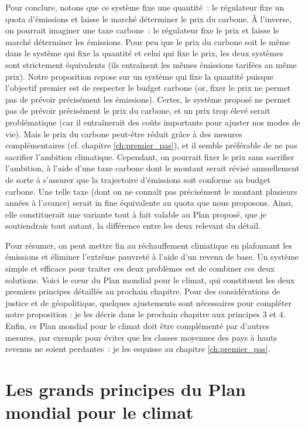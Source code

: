\documentclass[a5paper,french]{memoir}
\begin{document}
Pour conclure, notons que ce système fixe une quantité~: le régulateur fixe un quota d'émissions et laisse le marché déterminer le prix du carbone. À l'inverse, on pourrait imaginer une taxe carbone~: le régulateur fixe le prix et laisse le marché déterminer les émissions. Pour peu que le prix du carbone soit le même dans le système qui fixe la quantité et celui qui fixe le prix, les deux systèmes sont strictement équivalents (ils entraînent les mêmes émissions tarifées au même prix). Notre proposition repose sur un système qui fixe la quantité puisque l'objectif premier est de respecter le budget carbone (or, fixer le prix ne permet pas de prévoir précisément les émissions). Certes, le système proposé ne permet pas de prévoir précisément le prix du carbone, et un prix trop élevé serait problématique (car il entraînerait des coûts importants pour ajuster nos modes de vie). Mais le prix du carbone peut-être réduit grâce à des mesures complémentaires (cf. chapitre \ref{ch:premier_pas}), et il semble préférable de ne pas sacrifier l'ambition climatique. Cependant, on pourrait fixer le prix sans sacrifier l'ambition, à l'aide d'une taxe carbone dont le montant serait révisé annuellement de sorte à s'assurer que la trajectoire d'émissions soit conforme au budget carbone. Une telle taxe (dont on ne connaît pas précisément le montant plusieurs années à l'avance) serait in fine équivalente au quota que nous proposons. Ainsi, elle constituerait une variante tout à fait valable au Plan proposé, que je soutiendrais tout autant, la différence entre les deux relevant du détail. 

Pour résumer, on peut mettre fin au réchauffement climatique en plafonnant les émissions et éliminer l'extrême pauvreté à l'aide d'un revenu de base. Un système simple et efficace pour traiter ces deux problèmes est de combiner ces deux solutions. Voici le cœur du Plan mondial pour le climat, %
qui constituent les deux premiers principes détaillés au prochain chapitre. Pour des considérations de justice et de géopolitique, quelques ajustements sont nécessaires pour compléter notre proposition : je les décris dans le prochain chapitre aux principes 3 et 4. Enfin, ce Plan mondial pour le climat doit être complémenté par d'autres mesures, par exemple pour éviter que les classes moyennes des pays à hauts revenus ne soient perdantes~: je les esquisse au chapitre \ref{ch:premier_pas}.

\chapter{Les grands principes du Plan mondial pour le climat\label{ch:principes}}
\end{document}

